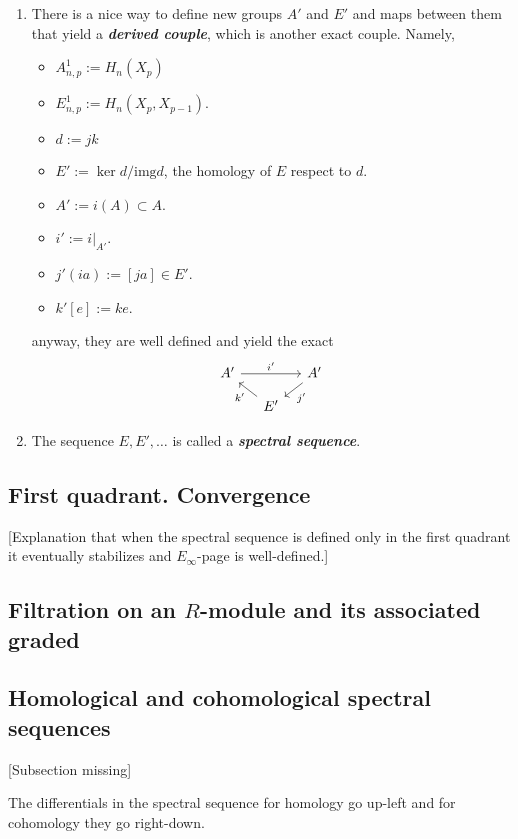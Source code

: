 \begin{remark}
\begin{definition}
\begin{enumerate}
	\item There is a nice way to define new groups $A'$ and $E'$ and maps between them that yield a \textit{\textbf{derived couple}}, which is another exact couple.	Namely,
		\begin{itemize}
			\item $A^1_{n,p}:=H_n(X_p)$
			\item $E^1_{n,p}:=H_n(X_p,X_{p-1})$.
			\item $d:=jk$
			\item $E':=\ker d/\text{img}d$, the homology of $E$ respect to $d$.
			\item $A':=i(A)\subset A$.
			\item $i':=i|_{A'}$.
			\item $j'(ia):=[ja]\in E'$.
			\item $k'[e]:=ke$.
		\end{itemize}
	anyway, they are well defined and yield the exact
	\[\begin{tikzcd}[column sep=small,row sep=small]
		A'\arrow[rr,"i'"]&&A'\arrow[dl,"j'"]\\
		&E'\arrow[ul,"k'"]
	\end{tikzcd}\]

	\item The sequence $E,E',\ldots$ is called a \textit{\textbf{spectral sequence}}.
\end{enumerate}

\subsection{First quadrant. Convergence}

[Explanation that when the spectral sequence is defined only in the first quadrant it eventually stabilizes and $E_{\infty}$-page is well-defined.]

\subsection{Filtration on an \texorpdfstring{$R$}{R}-module and its associated graded}

\subsection{Homological and cohomological spectral sequences}

[Subsection missing]

\begin{remark}
	The differentials in the spectral sequence for homology go up-left and for cohomology they go right-down.
\end{remark}


\end{definition}
\end{remark}
